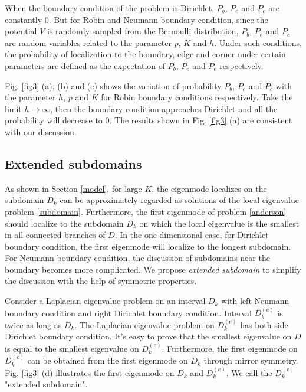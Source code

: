 \documentclass[a4paper,11pt]{article}
\begin{document}
When the boundary condition of the problem is Dirichlet, $P_b$, $P_e$ and $P_c$ are constantly $0$. But for Robin and Neumann boundary condition, since the potential $V$ is randomly sampled from the Bernoulli distribution, $P_b$, $P_e$ and $P_c$ are random variables related to the parameter $p$, $K$ and $h$. Under such conditions, the probability of localization to the boundary, edge and corner under certain parameters are defined as the expectation of $P_b$, $P_e$ and $P_c$ respectively.

Fig. \ref{fig3} (a), (b) and (c) shows the variation of probability $P_b$, $P_e$ and $P_c$ with the parameter $h$, $p$ and $K$ for Robin boundary conditions respectively. Take the limit $h \rightarrow \infty$, then the boundary condition approaches Dirichlet and all the probability will decrease to $0$. The results shown in Fig. \ref{fig3} (a) are consistent with our discussion.

\subsection{Extended subdomains}

As shown in Section \ref{model}, for large $K$, the eigenmode localizes on the subdomain $D_k$ can be approximately regarded as solutions of the local eigenvalue problem \eqref{subdomain}. Furthermore, the first eigenmode of problem \eqref{anderson} should localize to the subdomain $D_k$ on which the local eigenvalue is the smallest in all connected branches of $D$. In the one-dimensional case, for Dirichlet boundary condition, the first eigenmode will localize to the longest subdomain. For Neumann boundary condition, the discussion of subdomains near the boundary becomes more complicated. We propose \emph{extended subdomain} to simplify the discussion with the help of symmetric properties.

Consider a Laplacian eigenvalue problem on an interval $D_k$ with left Neumann boundary condition and right Dirichlet boundary condition. Interval $D_k^{(e)}$ is twice as long as $D_k$. The Laplacian eigenvalue problem on $D_k^{(e)}$ has both side Dirichlet boundary condition. It's easy to prove that the smallest eigenvalue on $D$ is equal to the smallest eigenvalue on $D_k^{(e)}$. Furthermore, the first eigenmode on $D_k^{(e)}$ can be obtained from the first eigenmode on $D_k$ through mirror symmetry. Fig. \ref{fig3} (d) illustrates the first eigenmode on $D_k$ and $D_k^{(e)}$. We call the $D_k^{(e)}$ "extended subdomain".
\end{document}
